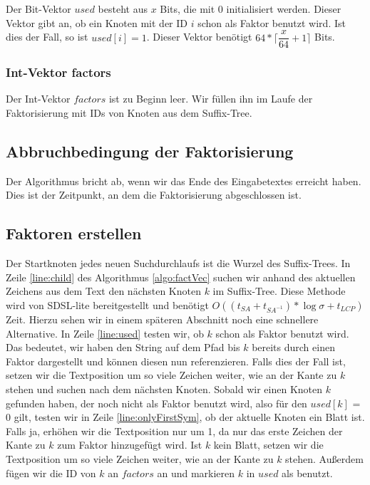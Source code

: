 \documentclass[a4paper,11pt]{scrartcl}%
\theoremstyle{change}
\theoremstyle{nonumberplain}
\theoremstyle{change}
\theoremstyle{nonumberplain}
\theoremstyle{change}
\theoremstyle{nonumberplain}
\begin{document}
Der Bit-Vektor $used$ besteht aus $x$ Bits, die mit 0 initialisiert werden. Dieser Vektor gibt an, ob ein Knoten mit der ID $i$ schon als Faktor benutzt wird.
Ist dies der Fall, so ist $used[i]=1$. Dieser Vektor benötigt $64*\lceil\dfrac{x}{64}+1\rceil$ Bits.\cite{sdsl}

\subsubsection{Int-Vektor factors}

Der Int-Vektor $factors$ ist zu Beginn leer. Wir füllen ihn im Laufe der Faktorisierung mit IDs von Knoten aus dem Suffix-Tree.  

\subsection{Abbruchbedingung der Faktorisierung}

Der Algorithmus bricht ab, wenn wir das Ende des Eingabetextes erreicht haben. Dies ist der Zeitpunkt, an dem die Faktorisierung abgeschlossen ist.

\subsection{Faktoren erstellen}

Der Startknoten jedes neuen Suchdurchlaufs ist die Wurzel des Suffix-Trees.
In Zeile \ref{line:child} des Algorithmus \ref{algo:factVec}  suchen wir anhand des aktuellen Zeichens aus dem Text den nächsten Knoten $k$ im Suffix-Tree. Diese Methode wird von SDSL-lite bereitgestellt und benötigt $O((t_{SA}+t_{SA^{-1}}) * \log \sigma + t_{LCP})$ Zeit. Hierzu sehen wir in einem späteren Abschnitt noch eine schnellere Alternative. In Zeile \ref{line:used} testen wir, ob $k$ schon als Faktor benutzt wird. Das bedeutet, wir haben den String  auf dem Pfad bis $k$ bereits durch einen Faktor dargestellt und können diesen nun referenzieren. Falls dies der Fall ist, setzen wir die Textposition um so viele Zeichen weiter, wie an der Kante zu $k$ stehen und suchen nach dem nächsten Knoten. Sobald wir einen Knoten $k$ gefunden haben, der noch nicht als Faktor benutzt wird, also für den $used[k]$ = 0 gilt, testen wir in Zeile \ref{line:onlyFirstSym}, ob der aktuelle Knoten ein Blatt ist. Falls ja, erhöhen wir die Textposition nur um 1, da nur das erste Zeichen der Kante zu $k$ zum Faktor hinzugefügt wird. Ist $k$ kein Blatt, setzen wir die Textposition um so viele Zeichen weiter, wie an der Kante zu $k$ stehen. Außerdem fügen wir die ID von $k$ an $factors$ an und markieren $k$ in $used$ als benutzt.
\end{document}
